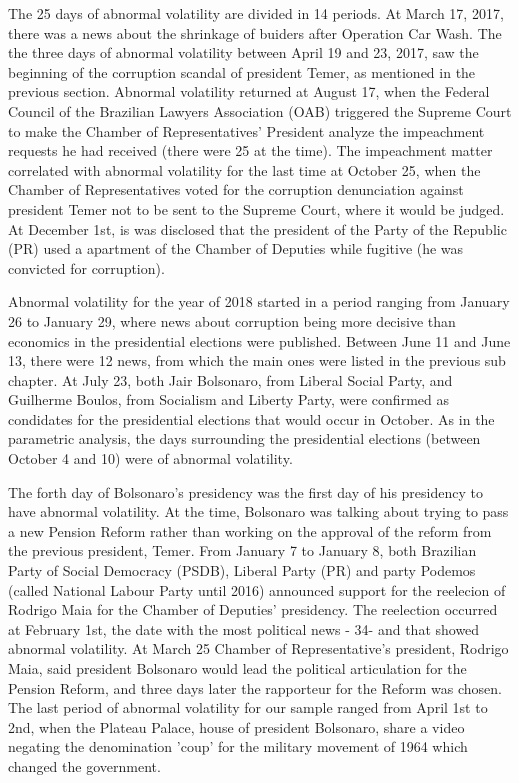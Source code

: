 \documentclass[a4paper]{article}
\begin{document}
The 25 days of abnormal volatility are divided in 14 periods. At March 17, 2017, there was a news about the shrinkage of buiders after Operation Car Wash. The the three days of abnormal volatility between April 19 and 23, 2017, saw the beginning of the corruption scandal of president Temer, as mentioned in the previous section. Abnormal volatility returned at August 17, when the Federal Council of the Brazilian Lawyers Association (OAB) triggered the Supreme Court to make the  Chamber of Representatives' President analyze the impeachment requests he had received (there were 25 at the time). The impeachment matter correlated with abnormal volatility for the last time at October 25, when the Chamber of Representatives voted for the corruption denunciation against president Temer not to be sent to the Supreme Court, where it would be judged. At December 1st, is was disclosed that the president of the Party of the Republic (PR) used a apartment of the Chamber of Deputies while fugitive (he was convicted for corruption).

Abnormal volatility for the year of 2018 started in a period ranging from January 26 to January 29, where news about corruption being more decisive than economics in the presidential elections were published. Between June 11 and June 13, there were 12 news, from which the main ones were listed in the previous sub chapter. At July 23, both Jair Bolsonaro, from Liberal Social Party, and Guilherme Boulos, from Socialism and Liberty Party, were confirmed as condidates for the presidential elections that would occur in October. As in the parametric analysis, the days surrounding the presidential elections (between October 4 and 10) were of abnormal volatility.


The forth day of Bolsonaro's presidency was the first day of his presidency to have abnormal volatility. At the time, Bolsonaro was talking about trying to pass a new Pension Reform rather than working on the approval of the reform from the previous president, Temer. From January 7 to January 8, both Brazilian Party of Social Democracy (PSDB), Liberal Party (PR) and party Podemos (called National Labour Party until 2016) announced support for the reelecion of Rodrigo Maia for the Chamber of Deputies' presidency. The reelection occurred at February 1st, the date with the most political news - 34- and that showed abnormal volatility. At March 25 Chamber of Representative's president, Rodrigo Maia, said president Bolsonaro would lead the political articulation for the Pension Reform, and three days later the rapporteur for the Reform was chosen. The last period of abnormal volatility for our sample ranged from April 1st to 2nd, when the Plateau Palace, house of president Bolsonaro, share a video negating the denomination 'coup' for the military movement of 1964 which changed the government.
\end{document}
